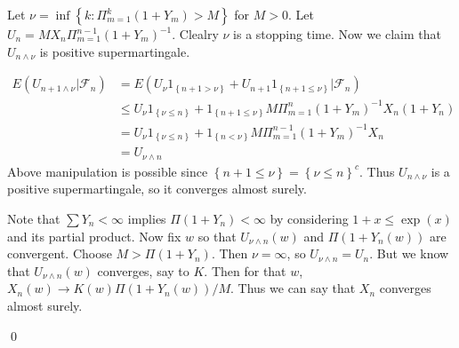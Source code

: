 \begin{problem}[4.2.8] \hfill

	Let $\nu = \inf\left\{ k : \Pi_{m=1}^{k}\left( 1+Y_m \right) > M \right\}$ for $M>0$.
	Let $U_n = MX_n \Pi_{m=1}^{n-1}\left( 1+Y_m \right)^{-1}$.
	Clealry $\nu$ is a stopping time.
	Now we claim that $U_{n \wedge \nu}$ is positive supermartingale.

\[
	\begin{split}
		E\left( U_{n+1 \wedge \nu} | \mathcal{F}_n \right)
		& = E\left( U_\nu 1_{\left\{ n+1 > \nu \right\}} + U_{n+1} 1_{ \left\{ n+1 \leq \nu \right\}} | \mathcal{F}_n \right) \\
		& \leq U_\nu 1_{ \left\{ \nu \leq n \right\}} +1_{ \left\{ n+1 \leq \nu \right\}} M \Pi_{m=1}^n \left( 1+Y_m \right)^{-1} X_n (1+Y_n) \\
		& = U_{\nu} 1_{ \left\{ \nu \leq n \right\}} + 1_{ \left\{ n < \nu \right\}} M \Pi_{m=1}^{n-1}\left( 1+Y_m \right)^{-1}X_n\\
		& = U_{\nu \wedge n}
	\end{split}
\]
Above manipulation is possible since $\left\{ n+1 \leq \nu \right\} = \left\{ \nu \leq n \right\}^c$.
Thus $U_{n \wedge \nu}$ is a positive supermartingale, so it converges almost surely.

Note that $\sum Y_n < \infty$ implies $\Pi (1+Y_n) < \infty$ by considering $1+x \leq \exp(x)$ and its partial product.
Now fix $w$ so that $U_{\nu \wedge n}(w)$ and $\Pi(1+Y_n(w))$ are convergent. 
Choose $M > \Pi\left( 1+Y_n \right)$.
Then $\nu = \infty$, so $U_{\nu \wedge n} = U_n$.
But we know that $U_{\nu \wedge n}(w)$ converges, say to $K$.
Then for that $w$, $X_n(w) \rightarrow K(w) \Pi\left( 1+Y_n(w) \right) /M$.
Thus we can say that $X_n$ converges almost surely.

\qed

\end{problem}

